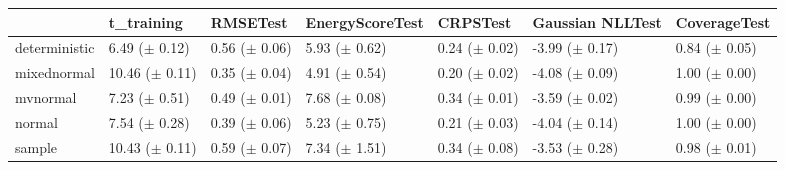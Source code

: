 \begin{tabular}{lllllll}
\toprule
 & t_training & RMSETest & EnergyScoreTest & CRPSTest & Gaussian NLLTest & CoverageTest \\
\midrule
deterministic & \makecell{6.49 \\ ($\pm$ 0.12)} & \makecell{0.56 \\ ($\pm$ 0.06)} & \makecell{5.93 \\ ($\pm$ 0.62)} & \makecell{0.24 \\ ($\pm$ 0.02)} & \makecell{-3.99 \\ ($\pm$ 0.17)} & \makecell{0.84 \\ ($\pm$ 0.05)} \\
mixednormal & \makecell{10.46 \\ ($\pm$ 0.11)} & \makecell{0.35 \\ ($\pm$ 0.04)} & \makecell{4.91 \\ ($\pm$ 0.54)} & \makecell{0.20 \\ ($\pm$ 0.02)} & \makecell{-4.08 \\ ($\pm$ 0.09)} & \makecell{1.00 \\ ($\pm$ 0.00)} \\
mvnormal & \makecell{7.23 \\ ($\pm$ 0.51)} & \makecell{0.49 \\ ($\pm$ 0.01)} & \makecell{7.68 \\ ($\pm$ 0.08)} & \makecell{0.34 \\ ($\pm$ 0.01)} & \makecell{-3.59 \\ ($\pm$ 0.02)} & \makecell{0.99 \\ ($\pm$ 0.00)} \\
normal & \makecell{7.54 \\ ($\pm$ 0.28)} & \makecell{0.39 \\ ($\pm$ 0.06)} & \makecell{5.23 \\ ($\pm$ 0.75)} & \makecell{0.21 \\ ($\pm$ 0.03)} & \makecell{-4.04 \\ ($\pm$ 0.14)} & \makecell{1.00 \\ ($\pm$ 0.00)} \\
sample & \makecell{10.43 \\ ($\pm$ 0.11)} & \makecell{0.59 \\ ($\pm$ 0.07)} & \makecell{7.34 \\ ($\pm$ 1.51)} & \makecell{0.34 \\ ($\pm$ 0.08)} & \makecell{-3.53 \\ ($\pm$ 0.28)} & \makecell{0.98 \\ ($\pm$ 0.01)} \\
\bottomrule
\end{tabular}
